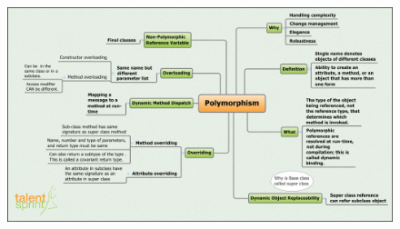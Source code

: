 \documentclass[11pt,a4paper]{article}
\begin{document}
\begin{figure}[H]
 \begin{center}
   \includegraphics[angle=90,height=20cm, width=13cm]{Polymorphism.png}
  
 \end{center}
 \end{figure}
\end{document}
